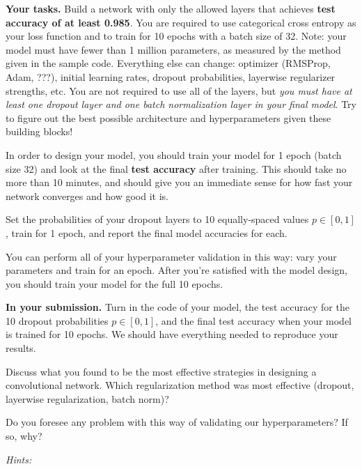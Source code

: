 \textbf{Your tasks.} Build a network with only the allowed layers that achieves \textbf{test accuracy of at least 0.985}. You are required to use categorical cross entropy as your loss function and to train for 10 epochs with a batch size of 32. Note: your model must have fewer than 1 million parameters, as measured by the method given in the sample code.
Everything else can change: optimizer (RMSProp, Adam, ???), initial learning rates, dropout probabilities, layerwise regularizer strengths, etc. You are not required to use all of the layers, but \emph{you must have
at least one dropout layer and one batch normalization layer in your final model}. Try to figure out the best possible architecture and hyperparameters given these building blocks!

In order to design your model, you should train your model for 1 epoch (batch size 32) and look at the final \textbf{test accuracy}  after training. This should take no more than 10 minutes, and should give you an immediate sense for how fast your network converges and how good it is.

Set the probabilities of your
dropout layers to 10 equally-spaced values $p \in [0, 1]$, train for 1 epoch, and report the final model accuracies for each.

You can perform all of your hyperparameter validation in this way: vary your parameters and train for an epoch. After you're satisfied with the model design, you should train your model for the full 10 epochs.

\textbf{In your submission.} Turn in the code of your model, the test accuracy for the 10 dropout probabilities $p \in [0, 1]$, and the
final test accuracy when your model
is trained for 10 epochs. We should have everything needed to reproduce your results.

Discuss what you found to be the most effective strategies in designing a convolutional network. Which regularization method was most effective (dropout, layerwise regularization, batch norm)?

Do you foresee any problem with this way of validating our hyperparameters? If so, why?

\emph{Hints:}

